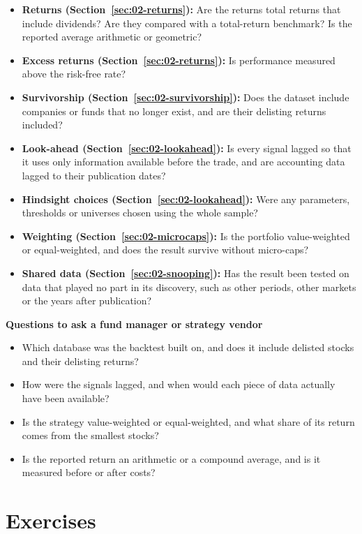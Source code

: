 \begin{itemize}
  \item[$\square$] \textbf{Returns (Section~\ref{sec:02-returns}):} Are the returns total returns that include dividends? Are they compared with a total-return benchmark? Is the reported average arithmetic or geometric?
  \item[$\square$] \textbf{Excess returns (Section~\ref{sec:02-returns}):} Is performance measured above the risk-free rate?
  \item[$\square$] \textbf{Survivorship (Section~\ref{sec:02-survivorship}):} Does the dataset include companies or funds that no longer exist, and are their delisting returns included?
  \item[$\square$] \textbf{Look-ahead (Section~\ref{sec:02-lookahead}):} Is every signal lagged so that it uses only information available before the trade, and are accounting data lagged to their publication dates?
  \item[$\square$] \textbf{Hindsight choices (Section~\ref{sec:02-lookahead}):} Were any parameters, thresholds or universes chosen using the whole sample?
  \item[$\square$] \textbf{Weighting (Section~\ref{sec:02-microcaps}):} Is the portfolio value-weighted or equal-weighted, and does the result survive without micro-caps?
  \item[$\square$] \textbf{Shared data (Section~\ref{sec:02-snooping}):} Has the result been tested on data that played no part in its discovery, such as other periods, other markets or the years after publication?
\end{itemize}

\textbf{Questions to ask a fund manager or strategy vendor}

\begin{itemize}
  \item Which database was the backtest built on, and does it include delisted stocks and their delisting returns?
  \item How were the signals lagged, and when would each piece of data actually have been available?
  \item Is the strategy value-weighted or equal-weighted, and what share of its return comes from the smallest stocks?
  \item Is the reported return an arithmetic or a compound average, and is it measured before or after costs?
\end{itemize}

\section*{Exercises}

